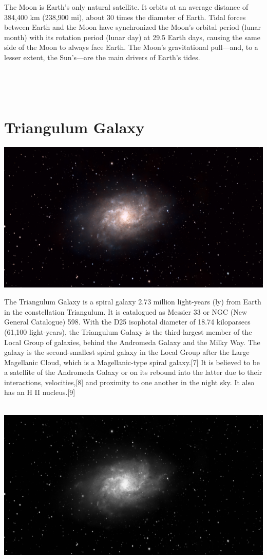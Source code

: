 {\footnotesize\color{white}
The Moon is Earth's only natural satellite. It orbits at an average distance of 384,400 km (238,900 mi), about 30 times the diameter of Earth. Tidal forces between Earth and the Moon have synchronized the Moon's orbital period (lunar month) with its rotation period (lunar day) at 29.5 Earth days, causing the same side of the Moon to always face Earth. The Moon's gravitational pull—and, to a lesser extent, the Sun's—are the main drivers of Earth's tides.


}\ \\
\begin{center}
\end{center}
\ \\\section{Triangulum Galaxy}
\includegraphics[width=\textwidth]{../Imaging//Original/Triangulum_Galaxy.jpg}
{\footnotesize\color{white}
The Triangulum Galaxy is a spiral galaxy 2.73 million light-years (ly) from Earth in the constellation Triangulum. It is catalogued as Messier 33 or NGC (New General Catalogue) 598. With the D25 isophotal diameter of 18.74 kiloparsecs (61,100 light-years), the Triangulum Galaxy is the third-largest member of the Local Group of galaxies, behind the Andromeda Galaxy and the Milky Way. The galaxy is the second-smallest spiral galaxy in the Local Group after the Large Magellanic Cloud, which is a Magellanic-type spiral galaxy.[7] It is believed to be a satellite of the Andromeda Galaxy or on its rebound into the latter due to their interactions, velocities,[8] and proximity to one another in the night sky. It also has an H II nucleus.[9]


}\ \\
\includegraphics[width=\textwidth]{../Imaging//Grayscale/Triangulum_Galaxy.jpg}

